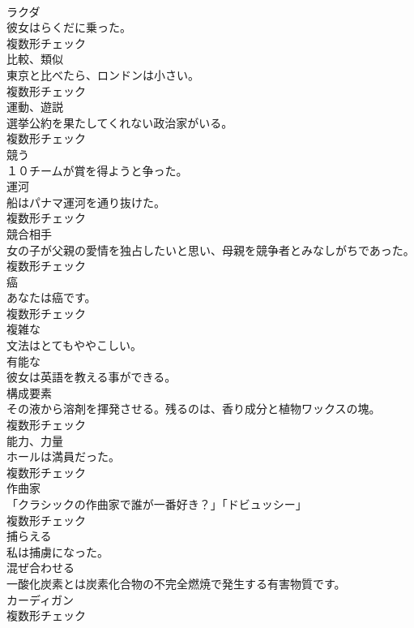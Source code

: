 \documentclass[8pt]{extreport}
\begin{document}
\begin{CJK}{UTF8}{min}
\\	[名詞]	ラクダ	
\\	彼女はらくだに乗った。	
\\	複数形チェック
\\	[名詞]	比較、類似	
\\	東京と比べたら、ロンドンは小さい。	
\\	複数形チェック
\\	[名詞]	運動、遊説	
\\	選挙公約を果たしてくれない政治家がいる。	
\\	複数形チェック
\\	[動詞]	競う	
\\	１０チームが賞を得ようと争った。	
\\	[名詞]	運河	
\\	船はパナマ運河を通り抜けた。	
\\	複数形チェック
\\	[名詞]	競合相手	
\\	女の子が父親の愛情を独占したいと思い、母親を競争者とみなしがちであった。	
\\	複数形チェック
\\	[名詞]	癌	
\\	あなたは癌です。	
\\	複数形チェック
\\	[形容詞]	複雑な	
\\	文法はとてもややこしい。	
\\	[形容詞]	有能な	
\\	彼女は英語を教える事ができる。	
\\	[名詞]	構成要素	
\\	その液から溶剤を揮発させる。残るのは、香り成分と植物ワックスの塊。	
\\	複数形チェック
\\	[名詞]	能力、力量	
\\	ホールは満員だった。	
\\	複数形チェック
\\	[名詞]	作曲家	
\\	「クラシックの作曲家で誰が一番好き？」「ドビュッシー」	
\\	複数形チェック
\\	[動詞]	捕らえる	
\\	私は捕虜になった。	
\\	[動詞]	混ぜ合わせる	
\\	一酸化炭素とは炭素化合物の不完全燃焼で発生する有害物質です。	
\\	[名詞]	カーディガン	
\\	複数形チェック

\end{CJK}
\end{document}
